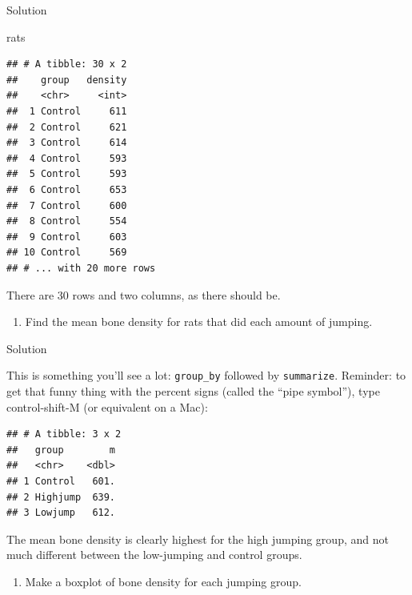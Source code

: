 \documentclass[]{tufte-book}
\newenvironment{Shaded}{}{}
\newcommand{\DataTypeTok}[1]{\textcolor[rgb]{0.56,0.13,0.00}{#1}}
\newcommand{\KeywordTok}[1]{\textcolor[rgb]{0.00,0.44,0.13}{\textbf{#1}}}
\newcommand{\NormalTok}[1]{#1}
\newcommand{\OperatorTok}[1]{\textcolor[rgb]{0.40,0.40,0.40}{#1}}
\newcommand{\StringTok}[1]{\textcolor[rgb]{0.25,0.44,0.63}{#1}}
\providecommand{\tightlist}{%
  \setlength{\itemsep}{0pt}\setlength{\parskip}{0pt}}
\theoremstyle{definition}
\theoremstyle{definition}
\theoremstyle{definition}
\theoremstyle{remark}
\begin{document}
Solution

\begin{Shaded}
\begin{Highlighting}[]
\NormalTok{rats}
\end{Highlighting}
\end{Shaded}

\begin{verbatim}
## # A tibble: 30 x 2
##    group   density
##    <chr>     <int>
##  1 Control     611
##  2 Control     621
##  3 Control     614
##  4 Control     593
##  5 Control     593
##  6 Control     653
##  7 Control     600
##  8 Control     554
##  9 Control     603
## 10 Control     569
## # ... with 20 more rows
\end{verbatim}

There are 30 rows and two columns, as there should be.

\begin{enumerate}
\def\labelenumi{(\alph{enumi})}
\setcounter{enumi}{4}
\tightlist
\item
  Find the mean bone density for rats that did each amount of jumping.
\end{enumerate}

Solution

This is something you'll see a lot: \texttt{group\_by} followed by
\texttt{summarize}. Reminder: to get that funny thing with the percent
signs (called the ``pipe symbol''), type control-shift-M (or equivalent
on a Mac):

\begin{Shaded}
\end{Shaded}

\begin{verbatim}
## # A tibble: 3 x 2
##   group        m
##   <chr>    <dbl>
## 1 Control   601.
## 2 Highjump  639.
## 3 Lowjump   612.
\end{verbatim}

The mean bone density is clearly highest for the high jumping group, and
not much different between the low-jumping and control groups.

\begin{enumerate}
\def\labelenumi{(\alph{enumi})}
\setcounter{enumi}{5}
\tightlist
\item
  Make a boxplot of bone density for each jumping group.
\end{enumerate}
\end{document}
